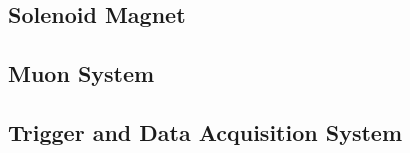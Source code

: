 \subsection{Solenoid Magnet}

\subsection{Muon System}

\subsection{Trigger and Data Acquisition System}


